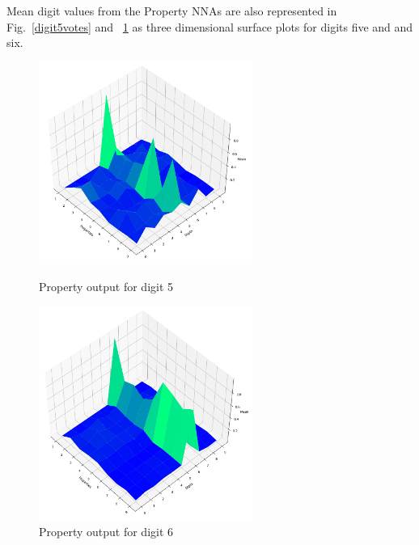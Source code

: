 \documentclass[conference]{IEEEtran}
\begin{document}
Mean digit values from the Property NNAs are also represented  in
Fig.~\ref{digit5votes} and ~\ref{digit6votes} as three dimensional surface plots
for digits five and  and six.

\begin{figure}[htbp]
\begin{minipage}{0.48\textwidth}
\centerline{\includegraphics[width=70mm]{./images/digit-5.png}}
\caption{Property output for digit 5}
\label{digit5votes}
\end{minipage}
\begin{minipage}{0.48\textwidth}
\centerline{\includegraphics[width=70mm]{./images/digit-6.png}}
\caption{Property output for digit 6}
\label{digit6votes}
\end{minipage}
\end{figure}
\end{document}
